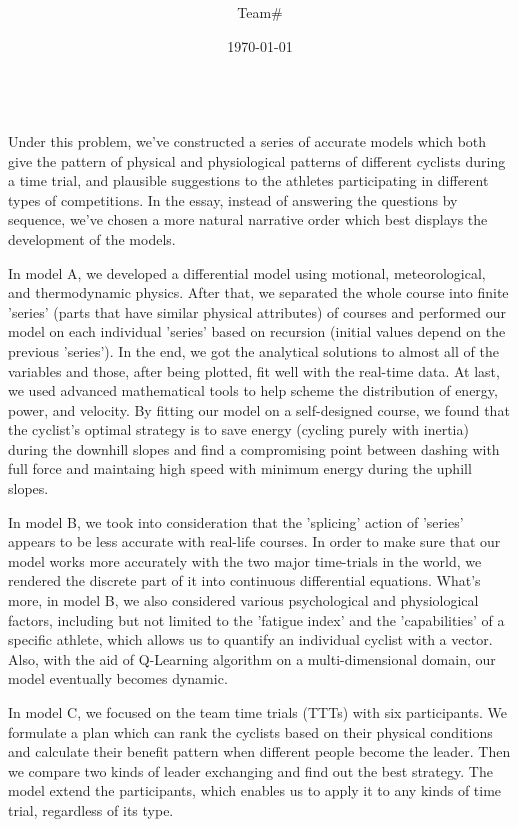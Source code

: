 \documentclass[14pt]{article}
\title{\Huge\textbf{\Title}}
\author{Team\#\Team}
\date{\today}
\theoremstyle{definition}
\theoremstyle{remark}
\numberwithin{equation}{section}
\begin{document}
	\normalfont{}\selectfont

	\large
	\qquad
	\par
	~~
	\\
	Under this problem, we've constructed a series of accurate models which both give the pattern of physical and physiological patterns of different cyclists during a time trial, and plausible suggestions to the athletes participating in different types of competitions. In the essay, instead of answering the questions by sequence, we've chosen a more natural narrative order which best displays the development of the models.

	In model A, we developed a differential model using motional, meteorological, and thermodynamic physics. After that, we separated the whole course into finite 'series' (parts that have similar physical attributes) of courses and performed our model on each individual 'series' based on recursion (initial values depend on the previous 'series'). In the end, we got the analytical solutions to almost all of the variables and those, after being plotted, fit well with the real-time data. At last, we used advanced mathematical tools to help scheme the distribution of energy, power, and velocity. By fitting our model on a self-designed course, we found that the cyclist's optimal strategy is to save energy (cycling purely with inertia) during the downhill slopes and find a compromising point between dashing with full force and maintaing high speed with minimum energy during the uphill slopes.

	In model B, we took into consideration that the 'splicing' action of 'series' appears to be less accurate with real-life courses. In order to make sure that our model works more accurately with the two major time-trials in the world, we rendered the discrete part of it into continuous differential equations. What's more, in model B, we also considered various psychological and physiological factors, including but not limited to the 'fatigue index' and the 'capabilities' of a specific athlete, which allows us to quantify an individual cyclist with a vector. Also, with the aid of Q-Learning algorithm on a multi-dimensional domain, our model eventually becomes dynamic.

	In model C, we focused on the team time trials (TTTs) with six participants. We formulate a plan which can rank the cyclists based on their physical conditions and calculate their benefit pattern when different people become the leader. Then we compare two kinds of leader exchanging and find out the best strategy. The model extend the participants, which enables us to apply it to any kinds of time trial, regardless of its type.
\end{document}
